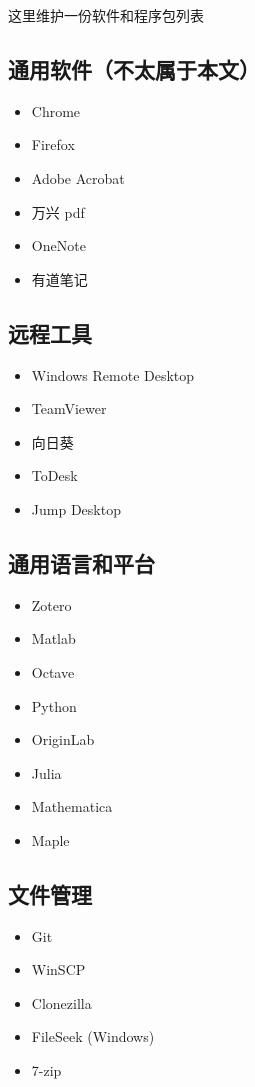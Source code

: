 
这里维护一份软件和程序包列表

\subsection{通用软件（不太属于本文）}
\begin{itemize}
\item Chrome
\item Firefox
\item Adobe Acrobat
\item 万兴 pdf
\item OneNote
\item 有道笔记
\end{itemize}

\subsection{远程工具}
\begin{itemize}
\item Windows Remote Desktop
\item TeamViewer
\item 向日葵
\item ToDesk
\item Jump Desktop
\end{itemize}

\subsection{通用语言和平台}
\begin{itemize}
\item Zotero
\item Matlab
\item Octave
\item Python
\item OriginLab
\item Julia
\item Mathematica
\item Maple
\end{itemize}

\subsection{文件管理}
\begin{itemize}
\item Git
\item WinSCP
\item Clonezilla
\item FileSeek (Windows)
\item 7-zip
\end{itemize}

